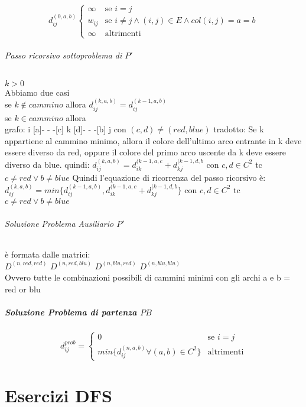 \documentclass[12pt, a4paper, openany]{book}
\begin{document}
\begin{equation*}
	d^{(0,a,b)}_{ij} \begin{cases}
		\infty & \text{se $i=j$}                                             \\
		w_{ij} & \text{se $i\neq j \land (i,j)\in E \land col(i,j) = a = b$} \\
		\infty & \text{altrimenti}
	\end{cases}
\end{equation*}

\subparagraph{Passo ricorsivo sottoproblema di $P'$} $k > 0$\\
Abbiamo due casi\\
se $k \notin cammino$ allora $d^{(k,a,b)}_{ij} = d^{(k-1,a,b)}_{ij}$\\
se $k \in cammino$ allora \\
grafo: i [a]- - -[c] k [d]- - -[b] j con $(c,d) \neq (red,blue)$
tradotto: Se k appartiene al cammino minimo, allora il colore dell'ultimo arco entrante in k deve essere diverso da red, oppure il colore del primo arco uscente da k deve essere diverso da blue.
quindi: $d^{(k,a,b)}_{ij} = d^{(k-1,a,c}_{ik} + d^{(k-1,d,b}_{kj}$ con $c,d \in C^2$ tc $c\neq red \vee b\neq blue$
Quindi l'equazione di ricorrenza del passo ricorsivo è:\\
$d^{(k,a,b)}_{ij} = min\{d^{(k-1,a,b)}_{ij} ,d^{(k-1,a,c}_{ik} + d^{(k-1,d,b}_{kj}\}$ con $c,d \in C^2$ tc $c\neq red \vee b\neq blue$

\subparagraph{Soluzione Problema Ausiliario $P'$} è formata dalle matrici:\\
$D^{(n,red,red)}$ $D^{(n,red,blu)}$ $D^{(n,blu,red)}$ $D^{(n,blu,blu)}$ \\
Ovvero tutte le combinazioni possibili di cammini minimi con gli archi a e b = red or blu

\paragraph{Soluzione Problema di partenza $PB$}
\begin{equation*}
	d^{prob}_{ij} = \begin{cases}
		0                                             & \text{se $i=j$}   \\
		min\{d^{(n,a,b)}_{ij} \forall (a,b) \in C^2\} & \text{altrimenti}
	\end{cases}
\end{equation*}
\chapter{Esercizi DFS}
\end{document}
